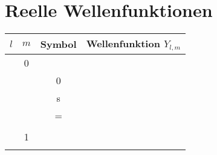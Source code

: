 \chapter{Reelle Wellenfunktionen}
\label{tabelle_wellenfunktionen}

\begin{longtable}{c|c|c|c}
	$ l $ & $ m $ & Symbol & Wellenfunktion $ Y_{l,m} $ \\
	\hline
	\begin{minipage}{0.04\textwidth}
		\vspace*{-3ex}%
		\[
		\begin{aligned}
	 		&0\vphantom{\sqrt{\frac{1}{\pi}}} \\
		\end{aligned}
		\]
	\end{minipage}  
	& 
	\begin{minipage}{0.04\textwidth}
		\vspace*{-3ex}%
		\[
		\begin{aligned}
		 	\phantom{-}&0\vphantom{\sqrt{\frac{1}{\pi}}} \\
		\end{aligned}
		\]
	\end{minipage}
	& 
	\begin{minipage}{0.05\textwidth}
		\vspace*{-3ex}%
		\[
		\begin{aligned}
			&s\vphantom{\sqrt{\frac{1}{\pi}}} \\
		\end{aligned}
		\]
	\end{minipage} 
	& 
	\begin{minipage}{0.6\textwidth}
		\vspace*{1ex}%
		\[
		\begin{aligned}
			Y_{0,0} &= \frac{1}{2} \sqrt{\frac{1}{\pi}}
		\end{aligned}
		\]
		~
	\end{minipage} 
	\\ \hline
	\begin{minipage}{0.04\textwidth}
		\vspace*{-3.5ex}%
		\[
		\begin{aligned}
			&\vphantom{\sqrt{\frac{3}{4 \pi}}} \\
	 		&1\vphantom{\sqrt{\frac{3}{4 \pi}}} \\
	 		&\vphantom{\sqrt{\frac{3}{4 \pi}}}
		\end{aligned}
		\]
	\end{minipage} 
	& 
	\begin{minipage}{0.04\textwidth}

\end{minipage}
\end{longtable}
